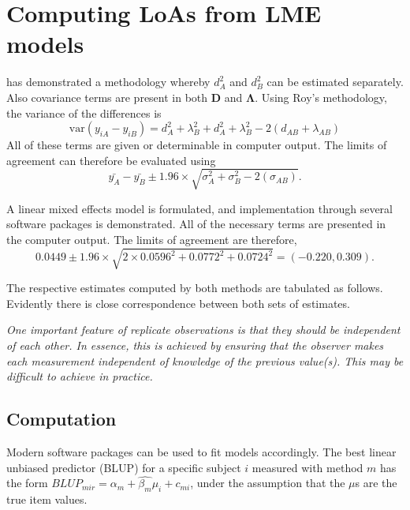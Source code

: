 \documentclass[12pt, a4paper]{report}
\theoremstyle{plain}
\theoremstyle{definition}
\theoremstyle{remark}
\begin{document}
\section{Computing LoAs from LME models}

\citet{ARoy2009} has demonstrated a methodology whereby $d^2_{A}$ and $d^2_{B}$ can be estimated separately. Also covariance terms are present in both $\boldsymbol{D}$ and $\boldsymbol{\Lambda}$. Using Roy's methodology, the variance of the differences is
\begin{equation}
\mbox{var} (y_{iA}-y_{iB})= d^2_{A} + \lambda^2_{B} + d^2_{A} + \lambda^2_{B} - 2(d_{AB} + \lambda_{AB})
\end{equation}
All of these terms are given or determinable in computer output.
The limits of agreement can therefore be evaluated using
\begin{equation}
\bar{y_{A}}-\bar{y_{B}} \pm 1.96 \times \sqrt{ \sigma^2_{A} + \sigma^2_{B}  - 2(\sigma_{AB})}.
\end{equation}

A linear mixed effects model is formulated, and implementation through several software packages is demonstrated.
All of the necessary terms are presented in the computer output. The limits of agreement are therefore,
\begin{equation}
0.0449  \pm 1.96 \times  \sqrt{2 \times 0.0596^2 + 0.0772^2 + 0.0724^2} = (-0.220,  0.309).
\end{equation}





The respective estimates computed by both methods are tabulated as follows. Evidently there is close correspondence between both sets of estimates.


\emph{
	One important feature of replicate observations is that they should be independent
	of each other. In essence, this is achieved by ensuring that the observer makes each
	measurement independent of knowledge of the previous value(s). This may be difficult
	to achieve in practice.}



\subsection{Computation} Modern software
packages can be used to fit models accordingly. The best linear
unbiased predictor (BLUP) for a specific subject $i$ measured with
method $m$ has the form $BLUP_{mir} = \hat{\alpha_{m}} +
\hat{\beta_{m}}\mu_{i} + c_{mi}$, under the assumption that the
$\mu$s are the true item values.
\end{document}
